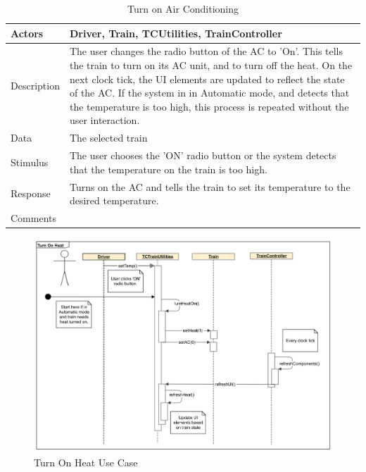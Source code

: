 \documentclass[]{article}
\begin{document}
\begin{table}[H]
	\centering
	\caption{Turn on Air Conditioning}
	\begin{tabular}{|l|l|}
		\hline
		Actors & \parbox[t]{10cm}{Driver, Train, TCUtilities, TrainController} \\ \hline
		Description & \parbox[t]{10cm}{The user changes the radio button of the AC to 'On'. This tells the train to turn on its AC unit, and to turn off the heat. On the next clock tick, the UI elements are updated to reflect the state of the AC. If the system in in Automatic mode, and detects that the temperature is too high, this process is repeated without the user interaction. } \\ \hline
		Data &  \parbox[t]{10cm}{The selected train} \\ \hline
		Stimulus &  \parbox[t]{10cm}{ The user chooses the 'ON' radio button or the system detects that the temperature on the train is too high. } \\ \hline
		Response & \parbox[t]{10cm}{Turns on the AC and tells the train to set its temperature to the desired temperature.}\\ \hline
		Comments & \parbox[t]{10cm}{}  \\ \hline
	\end{tabular}
\end{table}

\begin{figure}[H]
	\centering
	\includegraphics[scale=.5]{tc_turnOnHeat_usecase}
	\caption{Turn On Heat Use Case}
\end{figure}
\end{document}
